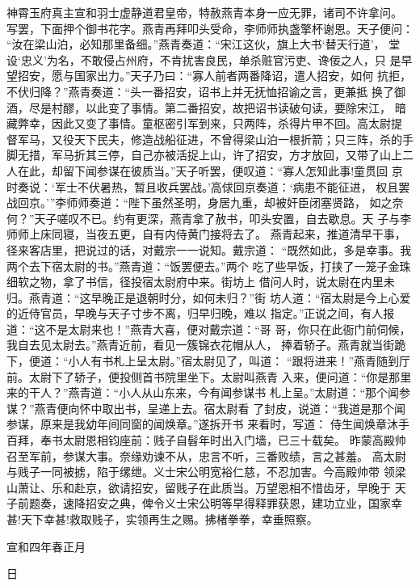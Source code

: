 神霄玉府真主宣和羽士虚静道君皇帝，特赦燕青本身一应无罪，诸司不许拿问。
写罢，下面押个御书花字。燕青再拜叩头受命，李师师执盏擎杯谢恩。天子便问：
“汝在梁山泊，必知那里备细。”燕青奏道：“宋江这伙，旗上大书‘替天行道’，
堂设‘忠义’为名，不敢侵占州府，不肯扰害良民，单杀赃官污吏、谗佞之人，只
是早望招安，愿与国家出力。”天子乃曰：“寡人前者两番降诏，遣人招安，如何
抗拒，不伏归降？”燕青奏道：“头一番招安，诏书上并无抚恤招谕之言，更兼抵
换了御酒，尽是村醪，以此变了事情。第二番招安，故把诏书读破句读，要除宋江，
暗藏弊幸，因此又变了事情。童枢密引军到来，只两阵，杀得片甲不回。高太尉提
督军马，又役天下民夫，修造战船征进，不曾得梁山泊一根折箭；只三阵，杀的手
脚无措，军马折其三停，自己亦被活捉上山，许了招安，方才放回，又带了山上二
人在此，却留下闻参谋在彼质当。”天子听罢，便叹道：“寡人怎知此事!童贯回
京时奏说：‘军士不伏暑热，暂且收兵罢战。’高俅回京奏道：‘病患不能征进，
权且罢战回京。’”李师师奏道：“陛下虽然圣明，身居九重，却被奸臣闭塞贤路，
如之奈何？”天子嗟叹不已。约有更深，燕青拿了赦书，叩头安置，自去歇息。天
子与李师师上床同寝，当夜五更，自有内侍黄门接将去了。
燕青起来，推道清早干事，径来客店里，把说过的话，对戴宗一一说知。戴宗道：
“既然如此，多是幸事。我两个去下宿太尉的书。”燕青道：“饭罢便去。”两个
吃了些早饭，打挟了一笼子金珠细软之物，拿了书信，径投宿太尉府中来。街坊上
借问人时，说太尉在内里未归。燕青道：“这早晚正是退朝时分，如何未归？”街
坊人道：“宿太尉是今上心爱的近侍官员，早晚与天子寸步不离，归早归晚，难以
指定。”正说之间，有人报道：“这不是太尉来也！”燕青大喜，便对戴宗道：“哥
哥，你只在此衙门前伺候，我自去见太尉去。”燕青近前，看见一簇锦衣花帽从人，
捧着轿子。燕青就当街跪下，便道：“小人有书札上呈太尉。”宿太尉见了，叫道：
“跟将进来！”燕青随到厅前。太尉下了轿子，便投侧首书院里坐下。太尉叫燕青
入来，便问道：“你是那里来的干人？”燕青道：“小人从山东来，今有闻参谋书
札上呈。”太尉道：“那个闻参谋？”燕青便向怀中取出书，呈递上去。宿太尉看
了封皮，说道：“我道是那个闻参谋，原来是我幼年间同窗的闻焕章。”遂拆开书
来看时，写道：
侍生闻焕章沐手百拜，奉书太尉恩相钧座前：贱子自髫年时出入门墙，已三十载矣。
昨蒙高殿帅召至军前，参谋大事。奈缘劝谏不从，忠言不听，三番败绩，言之甚羞。
高太尉与贱子一同被掳，陷于缧绁。义士宋公明宽裕仁慈，不忍加害。今高殿帅带
领梁山萧让、乐和赴京，欲请招安，留贱子在此质当。万望恩相不惜齿牙，早晚于
天子前题奏，速降招安之典，俾令义士宋公明等早得释罪获恩，建功立业，国家幸
甚!天下幸甚!救取贱子，实领再生之赐。拂楮拳拳，幸垂照察。

宣和四年春正月

日

